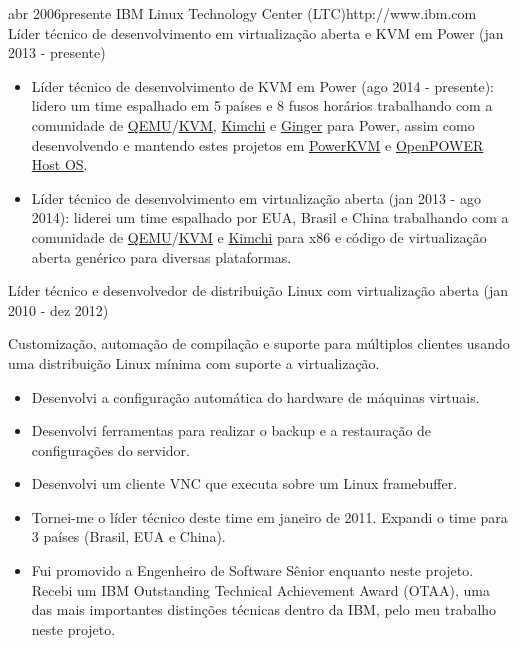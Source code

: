 \documentclass[10pt]{article} %
\begin{document}
\employer
{abr 2006}{presente}
{IBM Linux Technology Center (LTC)}{http://www.ibm.com}
\job
{Líder técnico de desenvolvimento em virtualização aberta e KVM em Power (jan 2013 - presente)}
{

\begin{itemize}
\item{Líder técnico de desenvolvimento de KVM em Power (ago 2014 - presente): lidero um time espalhado em 5 países e 8 fusos horários trabalhando com a comunidade de \href{http://www.qemu.org/}{QEMU}/\href{http://www.linux-kvm.org}{KVM}, \href{https://github.com/kimchi-project/kimchi}{Kimchi} e \href{https://github.com/kimchi-project/ginger}{Ginger} para Power, assim como desenvolvendo e mantendo estes projetos em \href{http://www-03.ibm.com/systems/power/software/linux/powerkvm/}{PowerKVM} e \href{https://open-power-host-os.github.io/}{OpenPOWER Host OS}.}
\item{Líder técnico de desenvolvimento em virtualização aberta (jan 2013 - ago 2014): liderei um time espalhado por EUA, Brasil e China trabalhando com a comunidade de \href{http://www.qemu.org/}{QEMU}/\href{http://www.linux-kvm.org}{KVM} e \href{https://github.com/kimchi-project/kimchi}{Kimchi} para x86 e código de virtualização aberta genérico para diversas plataformas.}
\end{itemize}

}
\job
{Líder técnico e desenvolvedor de distribuição Linux com virtualização aberta (jan 2010 - dez 2012)}
{Customização, automação de compilação e suporte para múltiplos clientes usando uma distribuição Linux mínima com suporte a virtualização.

\begin{itemize}
\item {Desenvolvi a configuração automática do hardware de máquinas virtuais.}
\item{Desenvolvi ferramentas para realizar o backup e a restauração de configurações do servidor.}
\item{Desenvolvi um cliente VNC que executa sobre um Linux framebuffer.}
\item{Tornei-me o líder técnico deste time em janeiro de 2011. Expandi o time para 3 países (Brasil, EUA e China).}
\item{Fui promovido a Engenheiro de Software Sênior enquanto neste projeto. Recebi um IBM Outstanding Technical Achievement Award (OTAA), uma das mais importantes distinções técnicas dentro da IBM, pelo meu trabalho neste projeto.}
\end{itemize}

}
\end{document}
